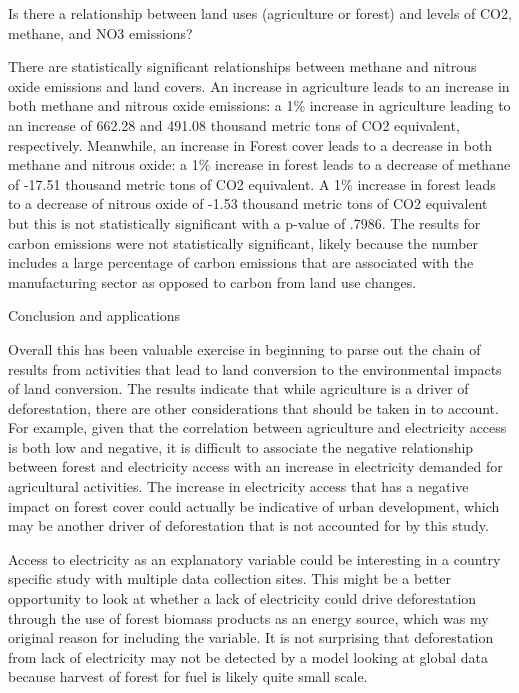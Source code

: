 \documentclass[12pt,]{article}
\begin{document}
Is there a relationship between land uses (agriculture or forest) and
levels of CO2, methane, and NO3 emissions?

There are statistically significant relationships between methane and
nitrous oxide emissions and land covers. An increase in agriculture
leads to an increase in both methane and nitrous oxide emissions: a 1\%
increase in agriculture leading to an increase of 662.28 and 491.08
thousand metric tons of CO2 equivalent, respectively. Meanwhile, an
increase in Forest cover leads to a decrease in both methane and nitrous
oxide: a 1\% increase in forest leads to a decrease of methane of -17.51
thousand metric tons of CO2 equivalent. A 1\% increase in forest leads
to a decrease of nitrous oxide of -1.53 thousand metric tons of CO2
equivalent but this is not statistically significant with a p-value of
.7986. The results for carbon emissions were not statistically
significant, likely because the number includes a large percentage of
carbon emissions that are associated with the manufacturing sector as
opposed to carbon from land use changes.

Conclusion and applications

Overall this has been valuable exercise in beginning to parse out the
chain of results from activities that lead to land conversion to the
environmental impacts of land conversion. The results indicate that
while agriculture is a driver of deforestation, there are other
considerations that should be taken in to account. For example, given
that the correlation between agriculture and electricity access is both
low and negative, it is difficult to associate the negative relationship
between forest and electricity access with an increase in electricity
demanded for agricultural activities. The increase in electricity access
that has a negative impact on forest cover could actually be indicative
of urban development, which may be another driver of deforestation that
is not accounted for by this study.

Access to electricity as an explanatory variable could be interesting in
a country specific study with multiple data collection sites. This might
be a better opportunity to look at whether a lack of electricity could
drive deforestation through the use of forest biomass products as an
energy source, which was my original reason for including the variable.
It is not surprising that deforestation from lack of electricity may not
be detected by a model looking at global data because harvest of forest
for fuel is likely quite small scale.
\end{document}
